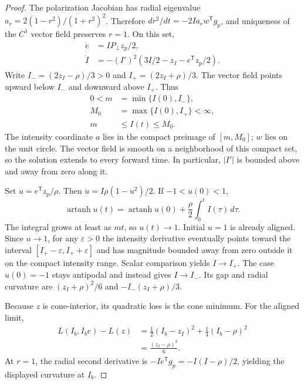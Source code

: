 \documentclass[10pt,a4paper]{article}
\begin{document}
\begin{proof}
The polarization Jacobian has radial eigenvalue $a_r=2(1-r^2)/(1+r^2)^2$. Therefore $d r^2/dt=-2Ia_r w^{\mathsf T}g_p$, and uniqueness of the $C^1$ vector field preserves $r=1$. On this set,
\begin{equation}
 \begin{aligned}
 \dot e&=I P_\perp z_p/2,\\
 \dot I&=-(I')^2(3I/2-z_I-e^{\mathsf T}z_p/2).
 \end{aligned}
\end{equation}
Write $I_-=(2z_I-\rho)/3>0$ and $I_+=(2z_I+\rho)/3$. The vector field points upward below $I_-$ and downward above $I_+$. Thus
\begin{equation}
 \begin{aligned}
 0<m&=\min\{I(0),I_-\},\\
 M_0&=\max\{I(0),I_+\}<\infty,\\
 m&\leq I(t)\leq M_0.
 \end{aligned}
\end{equation}
The intensity coordinate $a$ lies in the compact preimage of $[m,M_0]$; $w$ lies on the unit circle. The vector field is smooth on a neighborhood of this compact set, so the solution extends to every forward time. In particular, $|I'|$ is bounded above and away from zero along it.

Set $u=e^{\mathsf T}z_p/\rho$. Then $\dot u=I\rho(1-u^2)/2$. If $-1<u(0)<1$,
\begin{equation}
 \operatorname{artanh}u(t)=\operatorname{artanh}u(0)
        +\frac{\rho}{2}\int_0^t I(\tau)\,d\tau.
\end{equation}
The integral grows at least as $mt$, so $u(t)\to1$. Initial $u=1$ is already aligned. Since $u\to1$, for any $\varepsilon>0$ the intensity derivative eventually points toward the interval $[I_+-\varepsilon,I_++\varepsilon]$ and has magnitude bounded away from zero outside it on the compact intensity range. Scalar comparison yields $I\to I_+$. The case $u(0)=-1$ stays antipodal and instead gives $I\to I_-$. Its gap and radial curvature are $(z_I+\rho)^2/6$ and $-I_-(z_I+\rho)/3$.

Because $z$ is cone-interior, its quadratic loss is the cone minimum. For the aligned limit,
\begin{equation}
 \begin{aligned}
 L(I_b,I_b e)-L(z)
 &=\tfrac12(I_b-z_I)^2+\tfrac14(I_b-\rho)^2\\
 &=\frac{(z_I-\rho)^2}{6}.
 \end{aligned}
\end{equation}
At $r=1$, the radial second derivative is $-I e^{\mathsf T}g_p=-I(I-\rho)/2$, yielding the displayed curvature at $I_b$.
\end{proof}
\end{document}
